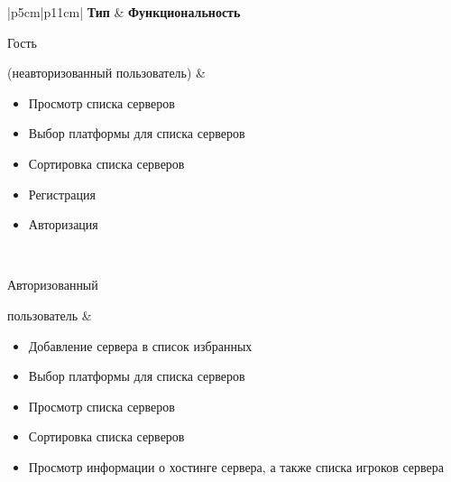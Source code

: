 \begin{table}[H]
    \centering
	\caption{Типы пользователей}
    \label{tbl:users_types}
	\begin{tabular}{|p{5cm}|p{11cm}|}
        \hline
        \textbf{Тип} & \textbf{Функциональность} \\ \hline

        Гость \par (неавторизованный пользователь) &
            \begin{minipage}[t]{\linewidth}
                \begin{itemize}[nosep,after=\strut]
                    \item Просмотр списка серверов
                    \item Выбор платформы для списка серверов
                    \item Сортировка списка серверов
                    \item Регистрация
                    \item Авторизация
                \end{itemize}
            \end{minipage} 
        \\ \hline

        Авторизованный \par пользователь &
            \begin{minipage}[t]{\linewidth}
                \begin{itemize}[nosep,after=\strut]
                    \item Добавление сервера в список избранных
                    \item Выбор платформы для списка серверов
                    \item Просмотр списка серверов
                    \item Сортировка списка серверов
                    \item Просмотр информации о хостинге сервера, а также списка игроков сервера
                \end{itemize}
            \end{minipage} 
        \\ \hline


\end{tabular}
\end{table}
